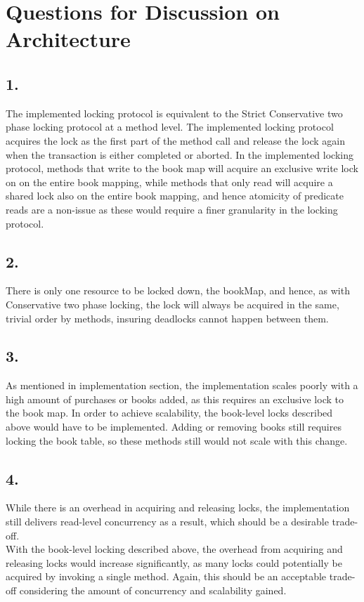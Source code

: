 \documentclass[12pt]{article}
\begin{document}
\section*{Questions for Discussion on Architecture} %
\subsection*{1.} %
The implemented locking protocol is equivalent to the Strict Conservative two phase locking protocol at a method level. The implemented locking protocol acquires the lock as the first part of the method call and release the lock again when the transaction is either completed or aborted. In the implemented locking protocol, methods that write to the book map will acquire an exclusive write lock on on the entire book mapping, while methods that only read will acquire a shared lock also on the entire book mapping, and hence atomicity of predicate reads are a non-issue as these would require a finer granularity in the locking protocol.
\subsection*{2.} %
There is only one resource to be locked down, the bookMap, and hence, as with Conservative two phase locking, the lock will always be acquired in the same, trivial order by methods, insuring deadlocks cannot happen between them.
\subsection*{3.} %
As mentioned in implementation section, the implementation scales poorly with a high amount of purchases or books added, as this requires an exclusive lock to the book map. In order to achieve scalability, the book-level locks described above would have to be implemented. Adding or removing books still requires locking the book table, so these methods still would not scale with this change.
\subsection*{4.} %
While there is an overhead in acquiring and releasing locks, the implementation still delivers read-level concurrency as a result, which should be a desirable trade-off.\\
With the book-level locking described above, the overhead from acquiring and releasing locks would increase significantly, as many locks could potentially be acquired by invoking a single method. Again, this should be an acceptable trade-off considering the amount of concurrency and scalability gained.
\end{document}
